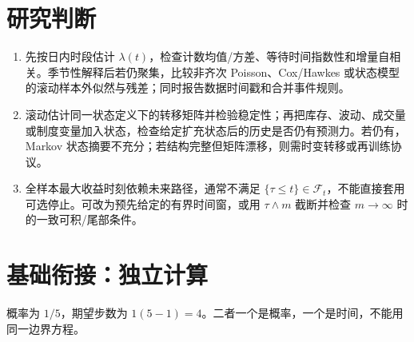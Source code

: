 \section*{研究判断}
\begin{enumerate}[leftmargin=*,start=10]
  \item 先按日内时段估计 $\lambda(t)$，检查计数均值/方差、等待时间指数性和增量自相关。季节性解释后若仍聚集，比较非齐次 Poisson、Cox/Hawkes 或状态模型的滚动样本外似然与残差；同时报告数据时间戳和合并事件规则。
  \item 滚动估计同一状态定义下的转移矩阵并检验稳定性；再把库存、波动、成交量或制度变量加入状态，检查给定扩充状态后的历史是否仍有预测力。若仍有，Markov 状态摘要不充分；若结构完整但矩阵漂移，则需时变转移或再训练协议。
  \item 全样本最大收益时刻依赖未来路径，通常不满足 $\{\tau\le t\}\in\mathcal F_t$，不能直接套用可选停止。可改为预先给定的有界时间窗，或用 $\tau\wedge m$ 截断并检查 $m\to\infty$ 时的一致可积/尾部条件。
\end{enumerate}


\MFQMappedUpperChElevenSolutions


\section*{基础衔接：独立计算}
概率为 $1/5$，期望步数为 $1(5-1)=4$。二者一个是概率，一个是时间，不能用同一边界方程。
